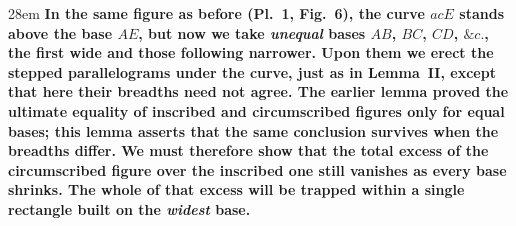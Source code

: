 \documentclass[border=4pt]{standalone}
\begin{document}
\begin{varwidth}{28em}
\large\bfseries
In the same figure as before (Pl.~1, Fig.~6), \textcolor{stepblue}{the curve $acE$} stands above \textcolor{basegreen}{the base $AE$}, but now we take \emph{unequal} bases $AB$, $BC$, $CD$, $\&c.$, the first wide and those following narrower. Upon them we erect \textcolor{stepblue}{the stepped parallelograms} under the curve, just as in \textbf{Lemma~II}, except that here their breadths need not agree. The earlier lemma proved the ultimate equality of inscribed and circumscribed figures only for equal bases; this lemma asserts that the same conclusion survives when the breadths differ. We must therefore show that the total excess of the circumscribed figure over the inscribed one still vanishes as every base shrinks. The whole of that excess will be trapped within a single rectangle built on the \emph{widest} base.
\end{varwidth}
\end{document}
